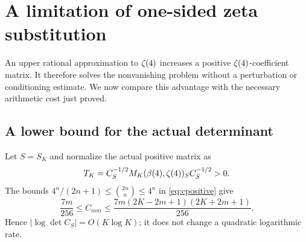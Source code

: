 \section{A limitation of one-sided zeta substitution}\label{sec:substitution}
An upper rational approximation to $\zeta(4)$ increases a positive
$\zeta(4)$-coefficient matrix. It therefore solves the nonvanishing problem
without a perturbation or conditioning estimate. We now compare this
advantage with the necessary arithmetic cost just proved.

\subsection{A lower bound for the actual determinant}
Let $S=S_K$ and normalize the actual positive matrix as
\[
 T_K=C_S^{-1/2}M_K(\beta(4),\zeta(4))_SC_S^{-1/2}>0.
\]
The bounds $4^n/(2n+1)\leq\binom{2n}{n}\leq4^n$ in
\eqref{eq:cpositive} give
\[
 \frac{7m}{256}\leq C_{mm}
 \leq\frac{7m(2K-2m+1)(2K+2m+1)}{256}.
\]
Hence $|\log\det C_S|=O(K\log K)$; it does not change a quadratic
logarithmic rate.

